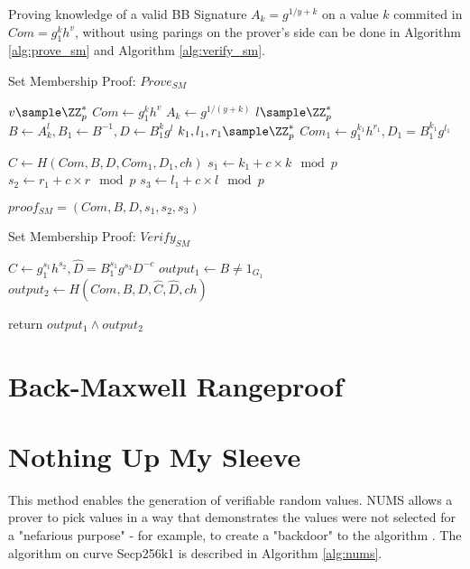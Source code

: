 Proving knowledge of a valid BB Signature $A_k = g^{1/{y+k}}$ on a value $k$ commited in $Com = g_1^k h^v$, without using parings on the prover's side can be done in Algorithm \ref{alg:prove_sm} and Algorithm \ref{alg:verify_sm}. 

\begin{algorithm}
 \caption{Set Membership Proof: $Prove_{SM}$}
    \label{alg:prove_sm}
    \LinesNumbered
    
    
    $v \sample \ZZ_p^*$\;
    $Com \gets g_1^k h^v$ \;
    $A_k \gets g^{1/(y+k)}$ \;
    $l \sample \ZZ_p^*$ \;
    $B \gets A_k^l, B_1 \gets B^{-1}, D \gets B_1^kg^l$ \;
    $k_1, l_1, r_1 \sample \ZZ_p^*$ \;
    $Com_1 \gets g_1^{k_1}h^{r_1}, D_1 = B_1^{k_1} g^{l_1}$ \;
    
    $C \gets H(Com, B, D, Com_1, D_1, ch)$ \;
    $s_1 \gets k_1 + c \times k \mod p$ \;
    $s_2 \gets r_1 + c \times r \mod p$ \;
    $s_3 \gets l_1 + c \times l \mod p$ \;
    
    $proof_{SM} = (Com, B, D, s_1, s_2, s_3)$
\end{algorithm}

\begin{algorithm}
 \caption{Set Membership Proof: $Verify_{SM}$}
    \label{alg:verify_sm}
    \LinesNumbered
    
    
    $\hat{C} \gets g_1^{s_1}h^{s_2}, \hat{D} = B_1^{s_1}g^{s_3}D^{-c}$ \;
    $output_1 \gets B \neq 1_{G_1}$ \;
    $output_2 \gets H(Com, B, D, \hat{C}, \hat{D}, ch)$ \;
    
    return $output_1 \land output_2$
\end{algorithm}

\section{Back-Maxwell Rangeproof}
\label{appendix:Back-Maxwell-Rangeproof}



\section{Nothing Up My Sleeve}
\label{appendix:NUMS}
This method enables the generation of verifiable random values. NUMS allows a prover to pick values in a way that demonstrates the values were not selected for a "nefarious purpose" - for example, to create a "backdoor" to the algorithm \cite{black2014elliptic}. The algorithm on curve Secp256k1 is described in Algorithm \ref{alg:nums}.

